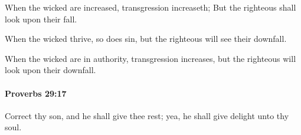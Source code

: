 			\begin{versebox}
					\item[BHS] 
					\item[ASV] When the wicked are increased, transgression increaseth; But the righteous shall look upon their fall.
					\item[NIV] When the wicked thrive, so does sin, but the righteous will see their downfall.
					\item[NRSV] When the wicked are in authority, transgression increases, but the righteous will look upon their downfall.
			\end{versebox}

		\paragraph{Proverbs 29:17} %
			\label{PROVERBS-29-17}

			Correct thy son, and he shall give thee rest; yea, he shall give delight unto thy soul.

